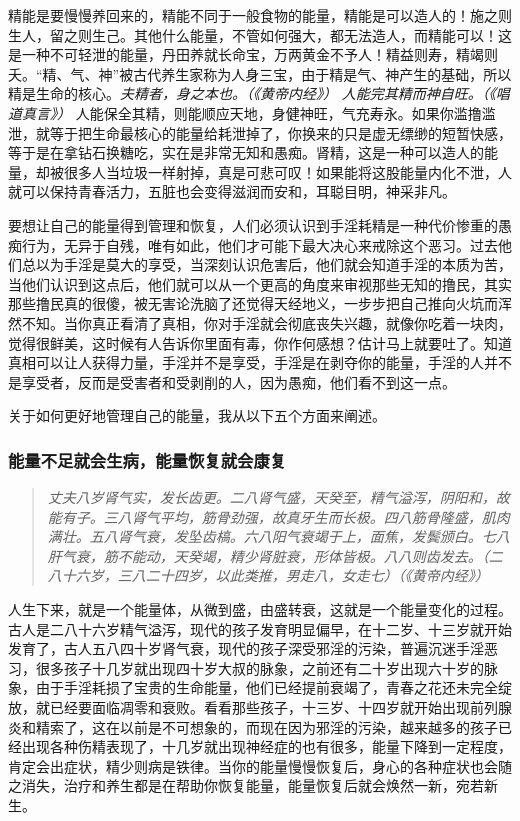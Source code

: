 精能是要慢慢养回来的，精能不同于一般食物的能量，精能是可以造人的！施之则生人，留之则生己。其他什么能量，不管如何强大，都无法造人，而精能可以！这是一种不可轻泄的能量，丹田养就长命宝，万两黄金不予人！精益则寿，精竭则夭。“精、气、神”被古代养生家称为人身三宝，由于精是气、神产生的基础，所以精是生命的核心。\textit{夫精者，身之本也。（《黄帝内经》）} \textit{人能完其精而神自旺。（《唱道真言》）} 人能保全其精，则能顺应天地，身健神旺，气充寿永。如果你滥撸滥泄，就等于把生命最核心的能量给耗泄掉了，你换来的只是虚无缥缈的短暂快感，等于是在拿钻石换糖吃，实在是非常无知和愚痴。肾精，这是一种可以造人的能量，却被很多人当垃圾一样射掉，真是可悲可叹！如果能将这股能量内化不泄，人就可以保持青春活力，五脏也会变得滋润而安和，耳聪目明，神采非凡。

要想让自己的能量得到管理和恢复，人们必须认识到手淫耗精是一种代价惨重的愚痴行为，无异于自残，唯有如此，他们才可能下最大决心来戒除这个恶习。过去他们总以为手淫是莫大的享受，当深刻认识危害后，他们就会知道手淫的本质为苦，当他们认识到这点后，他们就可以从一个更高的角度来审视那些无知的撸民，其实那些撸民真的很傻，被无害论洗脑了还觉得天经地义，一步步把自己推向火坑而浑然不知。当你真正看清了真相，你对手淫就会彻底丧失兴趣，就像你吃着一块肉，觉得很鲜美，这时候有人告诉你里面有毒，你作何感想？估计马上就要吐了。知道真相可以让人获得力量，手淫并不是享受，手淫是在剥夺你的能量，手淫的人并不是享受者，反而是受害者和受剥削的人，因为愚痴，他们看不到这一点。

关于如何更好地管理自己的能量，我从以下五个方面来阐述。

\subsubsection{能量不足就会生病，能量恢复就会康复}

\begin{quote}\it
    丈夫八岁肾气实，发长齿更。二八肾气盛，天癸至，精气溢泻，阴阳和，故能有子。三八肾气平均，筋骨劲强，故真牙生而长极。四八筋骨隆盛，肌肉满壮。五八肾气衰，发坠齿槁。六八阳气衰竭于上，面焦，发鬓颁白。七八肝气衰，筋不能动，天癸竭，精少肾脏衰，形体皆极。八八则齿发去。（二八十六岁，三八二十四岁，以此类推，男走八，女走七）（《黄帝内经》）
\end{quote}

人生下来，就是一个能量体，从微到盛，由盛转衰，这就是一个能量变化的过程。古人是二八十六岁精气溢泻，现代的孩子发育明显偏早，在十二岁、十三岁就开始发育了，古人五八四十岁肾气衰，现代的孩子深受邪淫的污染，普遍沉迷手淫恶习，很多孩子十几岁就出现四十岁大叔的脉象，之前还有二十岁出现六十岁的脉象，由于手淫耗损了宝贵的生命能量，他们已经提前衰竭了，青春之花还未完全绽放，就已经要面临凋零和衰败。看看那些孩子，十三岁、十四岁就开始出现前列腺炎和精索了，这在以前是不可想象的，而现在因为邪淫的污染，越来越多的孩子已经出现各种伤精表现了，十几岁就出现神经症的也有很多，能量下降到一定程度，肯定会出症状，精少则病是铁律。当你的能量慢慢恢复后，身心的各种症状也会随之消失，治疗和养生都是在帮助你恢复能量，能量恢复后就会焕然一新，宛若新生。


